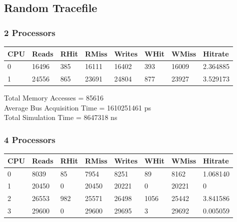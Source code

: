 \documentclass[]{article}
\begin{document}
\subsection{Random Tracefile}

\subsubsection{2 Processors}

\begin{table}[H]
	\begin{tabular}{|l|l|l|l|l|l|l|l|}
		\hline
		\textbf{CPU} & \textbf{Reads} & \textbf{RHit} & \textbf{RMiss} & \textbf{Writes} & \textbf{WHit} & \textbf{WMiss} & \textbf{Hitrate} \\ \hline
		0            & 16496          & 385           & 16111          & 16402           & 393           & 16009          & 2.364885         \\ \hline
		1            & 24556          & 865           & 23691          & 24804           & 877           & 23927          & 3.529173         \\ \hline
	\end{tabular}
\end{table}

Total Memory Accesses = 85616\\
Average Bus Acquisition Time = 1610251461 ps\\
Total Simulation Time = 8647318 ns\\

\subsubsection{4 Processors}

\begin{table}[H]
	\begin{tabular}{|l|l|l|l|l|l|l|l|}
		\hline
		\textbf{CPU} & \textbf{Reads} & \textbf{RHit} & \textbf{RMiss} & \textbf{Writes} & \textbf{WHit} & \textbf{WMiss} & \textbf{Hitrate} \\ \hline
		0            & 8039           & 85            & 7954           & 8251            & 89            & 8162           & 1.068140         \\ \hline
		1            & 20450          & 0             & 20450          & 20221           & 0             & 20221          & 0                \\ \hline
		2            & 26553          & 982           & 25571          & 26498           & 1056          & 25442          & 3.841586         \\ \hline
		3            & 29600          & 0             & 29600          & 29695           & 3             & 29692          & 0.005059         \\ \hline
	\end{tabular}
\end{table}
\end{document}
